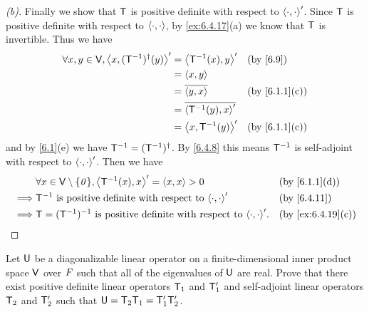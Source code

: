 \begin{proof}[(b)]
  Finally we show that \(\mathsf{T}\) is positive definite with respect to \(\left\langle\cdot, \cdot\right\rangle'\).
  Since \(\mathsf{T}\) is positive definite with respect to \(\left\langle\cdot, \cdot\right\rangle\), by \cref{ex:6.4.17}(a) we know that \(\mathsf{T}\) is invertible.
  Thus we have
  \begin{align*}
    \forall x, y \in \V, \inn{x, (\T^{-1})^{\dag}(y)}' & = \inn{\T^{-1}(x), y}'        &  & \by{6.9}      \\
                                                       & = \inn{x, y}                                     \\
                                                       & = \conj{\inn{y, x}}           &  & \by{6.1.1}[c] \\
                                                       & = \conj{\inn{\T^{-1}(y), x}'}                    \\
                                                       & = \inn{x, \T^{-1}(y)}'        &  & \by{6.1.1}[c]
  \end{align*}
  and by \cref{6.1}(e) we have \(\mathsf{T}^{-1} = (\mathsf{T}^{-1})^{\dag}\).
  By \cref{6.4.8} this means \(\mathsf{T}^{-1}\) is self-adjoint with respect to \(\left\langle\cdot, \cdot\right\rangle'\).
  Then we have
  \begin{align*}
             & \forall x \in \V \setminus \set{\zv}, \inn{\T^{-1}(x), x}' = \inn{x, x} > 0            &  & \by{6.1.1}[d]     \\
    \implies & \T^{-1} \text{ is positive definite with respect to } \inn{\cdot, \cdot}'              &  & \by{6.4.11}       \\
    \implies & \T = (\T^{-1})^{-1} \text{ is positive definite with respect to } \inn{\cdot, \cdot}'. &  & \by{ex:6.4.19}[c]
  \end{align*}
\end{proof}

\begin{ex}\label{ex:6.4.23}
  Let \(\mathsf{U}\) be a diagonalizable linear operator on a finite-dimensional inner product space \(\mathsf{V}\) over \(\mathit{F}\) such that all of the eigenvalues of \(\mathsf{U}\) are real.
  Prove that there exist positive definite linear operators \(\mathsf{T}_1\) and \(\mathsf{T}_1'\) and self-adjoint linear operators \(\mathsf{T}_2\) and \(\mathsf{T}_2'\) such that \(\mathsf{U} = \mathsf{T}_2 \mathsf{T}_1 = \mathsf{T}_1' \mathsf{T}_2'\).
\end{ex}

